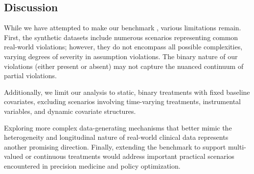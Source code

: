 \subsection{Discussion}
\label{ch04:sec:conclusion_limitations}

While we have attempted to make our benchmark , various limitations remain.
First, the synthetic datasets include numerous scenarios representing common real-world violations; however, they do not encompass all possible complexities, 
varying degrees of severity in assumption violations.
The binary nature of our violations (either present or absent) may not capture the nuanced continuum of partial violations. 


Additionally, we limit our analysis to static, binary treatments with fixed baseline covariates, excluding scenarios involving time-varying treatments, instrumental variables, and dynamic covariate structures. %

Exploring more complex data-generating mechanisms that better mimic the heterogeneity and longitudinal nature of real-world clinical data represents another promising direction.
Finally, extending the benchmark to support multi-valued or continuous treatments would address important practical scenarios encountered in precision medicine and policy optimization. 
